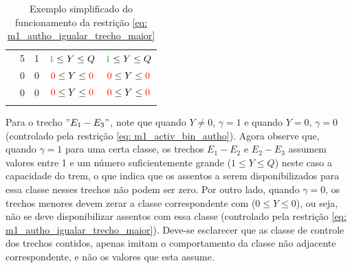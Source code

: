 \begin{small}
\begin{longtable}[c]{c|cccc|}
	\multicolumn{1}{|c|}{\cellcolor[HTML]{1D5B73}{\color[HTML]{FFFFFF} $c_4$}}     & 5                                                                     & {\color[HTML]{00b300} 1}                                              & ${\color[HTML]{00b300} 1} \leq Y \leq Q $                                                                 & ${\color[HTML]{00b300} 1} \leq Y \leq Q $                         \\ \cline{1-1}
	\multicolumn{1}{|c|}{\cellcolor[HTML]{1D5B73}{\color[HTML]{FFFFFF} $c_5$}}     & 0                                                                     & {\color[HTML]{FE0000} 0}                                              & ${\color[HTML]{FE0000} 0} \leq Y \leq {\color[HTML]{FE0000} 0} $                                          & ${\color[HTML]{FE0000} 0} \leq Y \leq {\color[HTML]{FE0000} 0} $                        \\ \cline{1-1}
	\multicolumn{1}{|c|}{\cellcolor[HTML]{1D5B73}{\color[HTML]{FFFFFF} $c_6$}}     & 0                                                                     & {\color[HTML]{FE0000} 0}                                              & ${\color[HTML]{FE0000} 0} \leq Y \leq {\color[HTML]{FE0000} 0} $                                          & ${\color[HTML]{FE0000} 0} \leq Y \leq {\color[HTML]{FE0000} 0} $                        \\ \hline
	\caption{Exemplo simplificado do funcionamento da restrição \ref{eq: m1_autho_igualar_trecho_maior}}
	\label{tab: exemplo_sip}
\end{longtable}
\end{small}



Para o trecho $"E_1-E_3"$, note que quando $Y \neq 0$, $\gamma = 1$ e quando $Y = 0$, $\gamma = 0$ (controlado pela restrição \ref{eq: m1_activ_bin_autho}). Agora observe que, quando $ \gamma = 1$ para uma certa classe, os trechos $E_1-E_2$ e $E_2-E_3$ assumem valores entre 1 e um número suficientemente grande ($1 \le Y \leq Q$) neste caso a capacidade do trem, o que indica que os assentos a serem disponibilizados para essa classe nesses trechos não podem ser zero. Por outro lado, quando $\gamma = 0$, os trechos menores devem zerar a classe correspondente com ($0 \leq Y \leq 0$), ou seja, não se deve disponibilizar assentos com essa classe (controlado pela restrição \ref{eq: m1_autho_igualar_trecho_maior}). Deve-se esclarecer que as classe de controle dos trechos contidos, apenas imitam o comportamento da classe não adjacente correspondente, e não os valores que esta assume.

